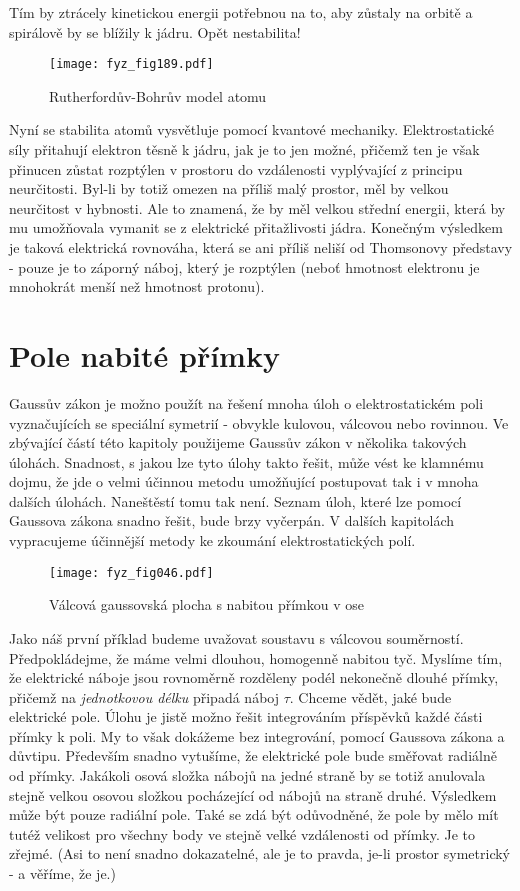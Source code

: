   Tím by ztrácely kinetickou energii potřebnou na to, aby zůstaly na orbitě a spirálově by se 
  blížily k jádru. Opět nestabilita!
  \begin{figure}[ht!] %
    \centering
    \texttt{[image: fyz\_fig189.pdf]}
    \caption{Rutherfordův-Bohrův model atomu}
    \label{fyz:fig189}
  \end{figure}      
  
  Nyní se stabilita atomů vysvětluje pomocí kvantové mechaniky. Elektrostatické síly přitahují 
  elektron těsně k jádru, jak je to jen možné, přičemž ten je však přinucen zůstat rozptýlen v 
  prostoru do vzdálenosti vyplývající z principu neurčitosti. Byl-li by totiž omezen na příliš 
  malý prostor, měl by velkou neurčitost v hybnosti. Ale to znamená, že by měl velkou střední 
  energii, která by mu umožňovala vymanit se z elektrické přitažlivosti jádra. Konečným 
  výsledkem je taková elektrická rovnováha, která se ani příliš neliší od Thomsonovy představy 
  - pouze je to záporný náboj, který je rozptýlen (neboť hmotnost elektronu je mnohokrát menší 
  než hmotnost protonu).

\section{Pole nabité přímky}\label{fyz:IIchapVsecIV}
  Gaussův zákon je možno použít na řešení mnoha úloh o elektrostatickém poli vyznačujících se 
  speciální symetrií - obvykle kulovou, válcovou nebo rovinnou. Ve zbývající částí této 
  kapitoly použijeme Gaussův zákon v několika takových úlohách. Snadnost, s jakou lze tyto 
  úlohy takto řešit, může vést ke klamnému dojmu, že jde o velmi účinnou metodu umožňující 
  postupovat tak i v mnoha dalších úlohách. Naneštěstí tomu tak není. Seznam úloh, které lze 
  pomocí Gaussova zákona snadno řešit, bude brzy vyčerpán. V dalších kapitolách vypracujeme 
  účinnější metody ke zkoumání elektrostatických polí.
  
  \begin{wrapfigure}[12]{r}{5cm}  %
    \centering
    \texttt{[image: fyz\_fig046.pdf]}
    \caption{Válcová gaussovská plocha s nabitou přímkou v ose}
    \label{fyz:fig046}
  \end{wrapfigure}
  Jako náš první příklad budeme uvažovat soustavu s válcovou souměrností. Předpokládejme, že 
  máme velmi dlouhou, homogenně nabitou tyč. Myslíme tím, že elektrické náboje jsou rovnoměrně 
  rozděleny podél nekonečně dlouhé přímky, přičemž na \emph{jednotkovou délku} připadá náboj 
  \(\tau\). Chceme vědět, jaké bude elektrické pole. Úlohu je jistě možno řešit integrováním 
  příspěvků každé části přímky k poli. My to však dokážeme bez integrování, pomocí Gaussova 
  zákona a důvtipu. Především snadno vytušíme, že elektrické pole bude směřovat radiálně od 
  přímky. Jakákoli osová složka nábojů na jedné straně by se totiž anulovala stejně velkou 
  osovou složkou pocházející od nábojů na straně druhé. Výsledkem může být pouze radiální pole. 
  Také se zdá být odůvodněné, že pole by mělo mít tutéž velikost pro všechny body ve stejně 
  velké vzdálenosti od přímky. Je to zřejmé. (Asi to není snadno dokazatelné, ale je to pravda, 
  je-li prostor symetrický - a věříme, že je.)
  
